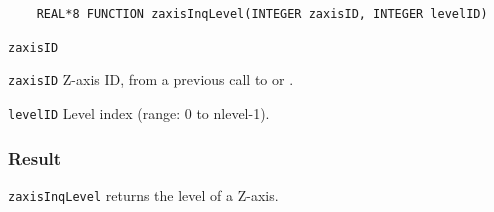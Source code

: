 \begin{verbatim}
    REAL*8 FUNCTION zaxisInqLevel(INTEGER zaxisID, INTEGER levelID)
\end{verbatim}

\hspace*{4mm}\begin{minipage}[]{15cm}
\begin{deflist}{\texttt{zaxisID}\ }
\item[\texttt{zaxisID}]
Z-axis ID, from a previous call to {} or {}.
\item[\texttt{levelID}]
Level index (range: 0 to nlevel-1).

\end{deflist}
\end{minipage}

\subsubsection*{Result}

{\texttt{zaxisInqLevel}} returns the level of a Z-axis.
